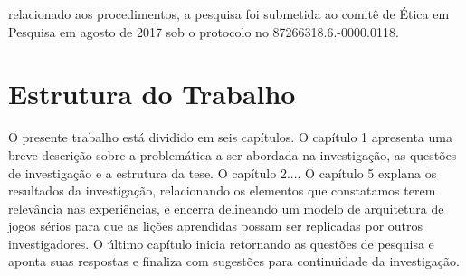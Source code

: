 relacionado aos procedimentos, a pesquisa foi submetida ao comitê de Ética em Pesquisa em agosto de 2017 sob o protocolo no 87266318.6.-0000.0118.





\section{Estrutura do Trabalho}\label{ch:Estrutura}

O presente trabalho está dividido em seis capítulos. O capítulo 1 apresenta uma breve
descrição sobre a problemática a ser abordada na investigação, as questões de
investigação e a estrutura da tese. O capítulo 2....  O capítulo 5
explana os resultados da investigação, relacionando os elementos que constatamos
terem relevância nas experiências, e encerra delineando um modelo de arquitetura de
jogos sérios para que as lições aprendidas possam ser replicadas por outros
investigadores. O último capítulo inicia retornando as questões de pesquisa e aponta
suas respostas e finaliza com sugestões para continuidade da investigação. 

\newpage







